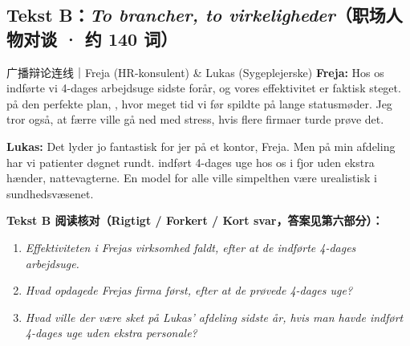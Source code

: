 \subsection*{Tekst B：\textit{To brancher, to virkeligheder}（职场人物对谈 · 约 140 词）}

\begin{emailbox}{广播辩论连线｜Freja (HR-konsulent) \& Lukas (Sygeplejerske)}
\textbf{Freja:} Hos os indførte vi 4-dages arbejdsuge sidste forår, og vores effektivitet er faktisk steget.  på den perfekte plan, , hvor meget tid vi før spildte på lange statusmøder. Jeg tror også, at færre ville gå ned med stress, hvis flere firmaer turde prøve det.

\textbf{Lukas:} Det lyder jo fantastisk for jer på et kontor, Freja. Men på min afdeling har vi patienter døgnet rundt.  indført 4-dages uge hos os i fjor uden ekstra hænder,  nattevagterne. En model for alle ville simpelthen være urealistisk i sundhedsvæsenet.
\end{emailbox}

\textbf{Tekst B 阅读核对（Rigtigt / Forkert / Kort svar，答案见第六部分）：}
\begin{enumerate}
  \item \textit{Effektiviteten i Frejas virksomhed faldt, efter at de indførte 4-dages arbejdsuge.} \underline{\hspace{2.2cm}}
  \item \textit{Hvad opdagede Frejas firma først, efter at de prøvede 4-dages uge?} \underline{\hspace{4.5cm}}
  \item \textit{Hvad ville der være sket på Lukas' afdeling sidste år, hvis man havde indført 4-dages uge uden ekstra personale?} \underline{\hspace{4.5cm}}
\end{enumerate}

